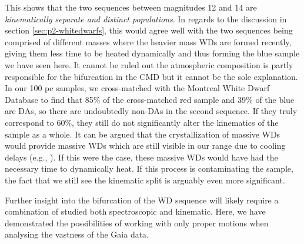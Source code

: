 This shows that the two sequences between magnitudes 12 and 14 are \textit{kinematically separate and distinct populations}. In regards to the discussion in section \ref{sec:p2-whitedwarfs}, this would agree well with the two sequences being comprised of different masses where the heavier mass WDs are formed recently, giving them less time to be heated dynamically and thus forming the blue sample we have seen here. It cannot be ruled out the atmospheric composition is partly responsible for the bifurcation in the CMD but it cannot be the sole explanation. In our 100 pc samples, we cross-matched with the Montreal White Dwarf Database \citep{dufour:17} to find that 85\% of the cross-matched red sample and 39\% of the blue are DAs, so there are undoubtedly non-DAs in the second sequence. If they truly correspond to 60\%, they still do not significantly alter the kinematics of the sample as a whole. It can be argued that the crystallization of massive WDs would provide massive WDs which are still visible in our range due to cooling delays (e.g., \citealt{tremblay:19, bergeron:19, bauer:20}). If this were the case, these massive WDs would have had the necessary time to dynamically heat. If this process is contaminating the sample, the fact that we still see the kinematic split is arguably even more significant.

Further insight into the bifurcation of the WD sequence will likely require a combination of studied both spectroscopic and kinematic. Here, we have demonstrated the possibilities of working with only proper motions when analysing the vastness of the Gaia data. 